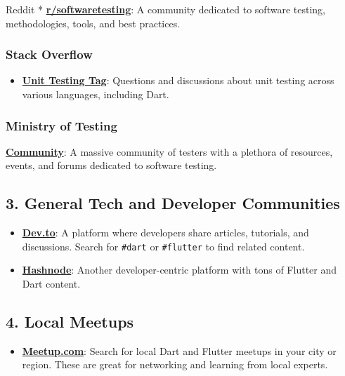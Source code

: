 \documentclass[
]{article}
\providecommand{\tightlist}{%
  \setlength{\itemsep}{0pt}\setlength{\parskip}{0pt}}
\begin{document}
Reddit *
\href{https://www.reddit.com/r/softwaretesting/}{\textbf{r/softwaretesting}}:
A community dedicated to software testing, methodologies, tools, and
best practices.

\subsubsection{Stack Overflow}\label{stack-overflow-1}

\begin{itemize}
\tightlist
\item
  \href{https://stackoverflow.com/questions/tagged/unit-testing}{\textbf{Unit
  Testing Tag}}: Questions and discussions about unit testing across
  various languages, including Dart.
\end{itemize}

\subsubsection{Ministry of Testing}\label{ministry-of-testing}

\href{https://www.ministryoftesting.com/}{\textbf{Community}}: A massive
community of testers with a plethora of resources, events, and forums
dedicated to software testing.

\subsection{3. General Tech and Developer
Communities}\label{general-tech-and-developer-communities}

\begin{itemize}
\tightlist
\item
  \href{https://dev.to/}{\textbf{Dev.to}}: A platform where developers
  share articles, tutorials, and discussions. Search for \texttt{\#dart}
  or \texttt{\#flutter} to find related content.
\item
  \href{https://hashnode.com/}{\textbf{Hashnode}}: Another
  developer-centric platform with tons of Flutter and Dart content.
\end{itemize}

\subsection{4. Local Meetups}\label{local-meetups}

\begin{itemize}
\tightlist
\item
  \href{https://www.meetup.com/}{\textbf{Meetup.com}}: Search for local
  Dart and Flutter meetups in your city or region. These are great for
  networking and learning from local experts.
\end{itemize}
\end{document}
